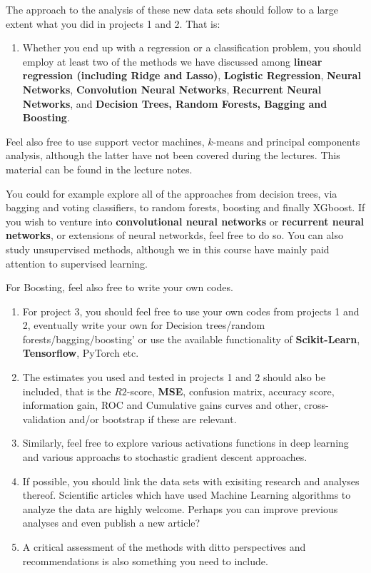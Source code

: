 \documentclass[%
oneside,                 %
final,                   %
10pt]{article}
\begin{document}
\noindent
The approach to the analysis of these new data sets should follow to a large extent what you did in projects 1 and 2. That is:
\begin{enumerate}
\item Whether you end up with a regression or a classification problem, you should employ at least two of the methods we have discussed among \textbf{linear regression (including Ridge and Lasso)}, \textbf{Logistic Regression}, \textbf{Neural Networks}, \textbf{Convolution Neural Networks}, \textbf{Recurrent Neural Networks}, and \textbf{Decision Trees, Random Forests, Bagging and Boosting}.
\end{enumerate}

\noindent
Feel also free to use support vector machines, $k$-means and principal components analysis, although the latter have not been covered during the lectures. This material can be found in the lecture notes.

You could for example explore  all of the approaches from decision trees, via bagging and voting classifiers, to random forests, boosting and finally XGboost. If you wish to venture into \textbf{convolutional neural networks} or \textbf{recurrent neural networks}, or extensions of neural networkds, feel free to do so. You can also study unsupervised methods, although we in this course have mainly paid attention to supervised learning. 

For Boosting, feel also free to write your own codes.

\begin{enumerate}
\item For project 3, you should feel free to use your own codes from projects 1 and 2, eventually write your own for Decision trees/random forests/bagging/boosting' or use the available functionality of \textbf{Scikit-Learn}, \textbf{Tensorflow}, PyTorch etc. 

\item The estimates you used and tested in projects 1 and 2 should also be included, that is the $R2$-score, \textbf{MSE}, confusion matrix, accuracy score, information gain,  ROC and Cumulative gains curves and other, cross-validation and/or bootstrap if these are relevant.

\item Similarly, feel free to explore various activations functions in deep learning and various approachs to stochastic gradient descent approaches.

\item If possible, you should link the data sets with exisiting research and analyses thereof. Scientific articles which have used Machine Learning algorithms to analyze the data are highly welcome. Perhaps you can improve previous analyses and even publish a new article? 

\item A critical assessment of the methods with ditto perspectives and recommendations is also something you need to include.
\end{enumerate}
\end{document}
